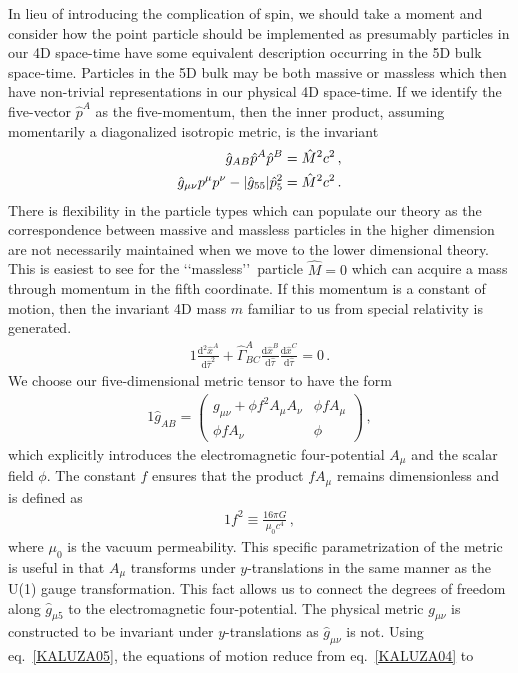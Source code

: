 In lieu of introducing the complication of spin, we should take a moment and consider how the point particle should be implemented as presumably particles in our 4D space-time have some equivalent description occurring in the 5D bulk space-time. Particles in the 5D bulk may be both massive or massless which then have non-trivial representations in our physical 4D space-time. If we identify the five-vector $\hat{p}^{A}$ as the five-momentum, then the inner product, assuming momentarily a diagonalized isotropic metric, is the invariant
\begin{alignat}{1}
	\notag\hat{g}_{AB}\hat{p}^{A}\hat{p}^{B}&=\hat{M}^{2}c^{2}\,,\\
	\label{eq:KKFiveMomentum}\hat{g}_{\mu\nu}p^{\mu}p^{\nu}-|\hat{g}_{55}|\hat{p}^{2}_{5}&=\hat{M}^{2}c^{2}\,.
\end{alignat}
There is flexibility in the particle types which can populate our theory as the correspondence between massive and massless particles in the higher dimension are not necessarily maintained when we move to the lower dimensional theory. This is easiest to see for the \lq\lq massless\rq\rq\ particle $\hat{M}=0$ which can acquire a mass through momentum in the fifth coordinate. If this momentum is a constant of motion, then the invariant 4D mass $m$ familiar to us from special relativity is generated.
\begin{alignat}{1}
	\label{KALUZA04} \frac{\mathrm{d}^{2}\hat{x}^{A}}{\mathrm{d}\hat{\tau}^{2}}+\hat{\Gamma}^{A}_{BC}\frac{\mathrm{d}\hat{x}^{B}}{\mathrm{d}\hat{\tau}}\frac{\mathrm{d}\hat{x}^{C}}{\mathrm{d}\hat{\tau}}=0\,.
\end{alignat}
We choose our five-dimensional metric tensor to have the form
\begin{alignat}{1}
 	\label{KALUZA05} \hat{g}_{AB}=
		\begin{pmatrix}
			g_{\mu\nu}+\phi f^{2}A_{\mu}A_{\nu} & \phi fA_{\mu}\\
			\phi fA_{\nu} & \phi
		\end{pmatrix}\,,
\end{alignat}
which explicitly introduces the electromagnetic four-potential $A_{\mu}$ and the scalar field $\phi$. The constant $f$ ensures that the product $fA_{\mu}$ remains dimensionless and is defined as
\begin{alignat}{1}
	\label{eq:kkfdef}f^{2}\equiv\frac{16\pi G}{\mu_{0}c^{4}}\,,
\end{alignat}
where $\mu_{0}$ is the vacuum permeability. This specific parametrization of the metric is useful in that $A_{\mu}$ transforms under $y$-translations in the same manner as the U(1) gauge transformation. This fact allows us to connect the degrees of freedom along $\hat{g}_{\mu5}$ to the electromagnetic four-potential. The physical metric $g_{\mu\nu}$ is constructed to be invariant under $y$-translations as $\hat{g}_{\mu\nu}$ is not. Using eq.~\eqref{KALUZA05}, the equations of motion reduce from eq.~\eqref{KALUZA04} to
